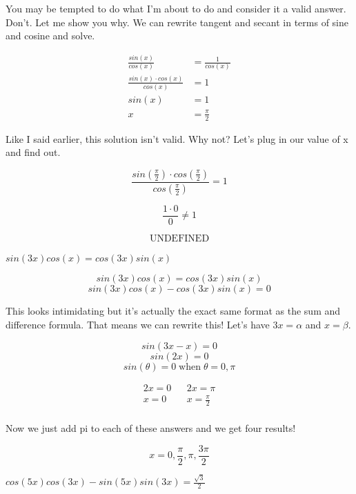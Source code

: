 \documentclass[10pt,letterpaper]{amspset}
\begin{document}
\begin{solution}
    You may be tempted to do what I'm about to do and consider it a valid answer. Don't. Let me show you why. We can rewrite tangent and secant in terms of sine and cosine and solve.
    
    \begin{align}
        \frac{sin(x)}{cos(x)} &= \frac{1}{cos(x)} \\
        \frac{sin(x) \cdot cos(x)}{cos(x)} &= 1 \\
        sin(x) &= 1 \\
        x &= \frac{\pi}{2}
    \end{align}
    
    Like I said earlier, this solution isn't valid. Why not? Let's plug in our value of x and find out.
    
    \[\frac{sin(\frac{\pi}{2}) \cdot cos(\frac{\pi}{2})}{cos(\frac{\pi}{2})} = 1 \]
    
    \[\frac{1 \cdot 0}{0} \neq 1\]
    
    \[\boxed{\text{UNDEFINED}}\]
\end{solution}


\begin{problem}[44]
    $sin(3x) cos(x) = cos(3x) sin(x)$
\end{problem}

\begin{solution}
    \[sin(3x) cos(x) = cos(3x) sin(x)\]
    \[sin(3x) cos(x) - cos(3x) sin(x) = 0\]
    
    This looks intimidating but it's actually the exact same format as the sum and difference formula. That means we can rewrite this! Let's have $3x = \alpha$ and $x = \beta$.
    
    \[sin(3x - x) = 0\]
    \[sin(2x) = 0\]
    \[sin(\theta) = 0 \; \text{when} \; \theta = 0, \pi\]
    
    \begin{align}
        2x = 0 && 2x = \pi \\
        x = 0 && x = \frac{\pi}{2} \\
    \end{align}
    
    Now we just add pi to each of these answers and we get four results!
    
    \[\boxed{ x = 0, \frac{\pi}{2}, \pi, \frac{3\pi}{2}   }\]
\end{solution}


\pagebreak


\begin{problem}[46]
    $cos(5x)cos(3x) - sin(5x)sin(3x) = \frac{\sqrt{3}}{2}$
\end{problem}
\end{document}
